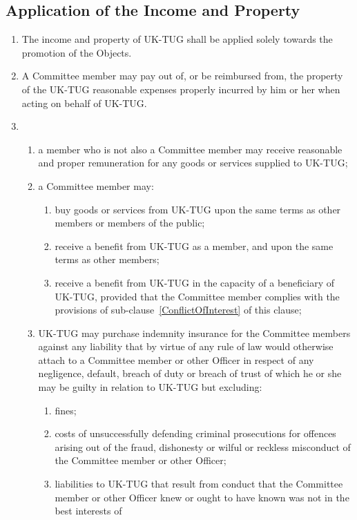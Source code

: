 \documentclass[a4paper,11pt]{article}
\begin{document}
\subsection{Application of the Income and Property}
\label{IncomeAndProperty}

\begin{enumerate}
\item The income and property of UK-TUG shall be applied solely towards the
  promotion of the Objects.
\item A Committee member may pay out of, or be reimbursed from, the
  property of the UK-TUG reasonable expenses properly incurred by him or her
  when acting on behalf of UK-TUG.
\item 
\begin{enumerate}
\item a member who is not also a Committee member may receive reasonable and
  proper remuneration for any goods or services supplied to UK-TUG;
\item a Committee member may:
\begin{enumerate}
\item buy goods or services from UK-TUG upon the same terms as other members
  or members of the public;
\item receive a benefit from UK-TUG as a member, and upon the same terms as
  other members;
\item receive a benefit from UK-TUG in the capacity of a beneficiary of
  UK-TUG, provided that the Committee member complies with the provisions of 
  sub-clause~\ref{ConflictOfInterest} of this clause;
\end{enumerate}
\item UK-TUG may purchase indemnity insurance for the Committee members against
  any liability that by virtue of any rule of law would otherwise attach to a
  Committee member or other Officer in respect of any negligence, default, breach
  of duty or breach of trust of which he or she may be guilty in relation to
  UK-TUG but excluding:
\begin{enumerate}
\item fines;
\item costs of unsuccessfully defending criminal prosecutions for offences
  arising out of the fraud, dishonesty or wilful or reckless misconduct of the
  Committee member or other Officer;
\item liabilities to UK-TUG that result from conduct that the Committee member
  or other Officer knew or ought to have known was not in the best interests of

\end{enumerate}
\end{enumerate}
\end{enumerate}
\end{document}

